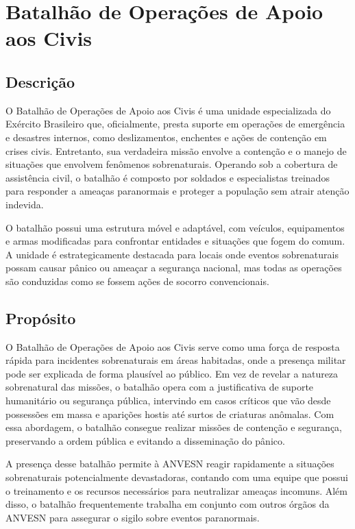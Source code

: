\documentclass{book}
\begin{document}
\chapter{Batalhão de Operações de Apoio aos Civis}
\section{Descrição}
O Batalhão de Operações de Apoio aos Civis é uma unidade especializada do Exército Brasileiro que, oficialmente, presta suporte em operações de emergência e desastres internos, como deslizamentos, enchentes e ações de contenção em crises civis. Entretanto, sua verdadeira missão envolve a contenção e o manejo de situações que envolvem fenômenos sobrenaturais. Operando sob a cobertura de assistência civil, o batalhão é composto por soldados e especialistas treinados para responder a ameaças paranormais e proteger a população sem atrair atenção indevida.

O batalhão possui uma estrutura móvel e adaptável, com veículos, equipamentos e armas modificadas para confrontar entidades e situações que fogem do comum. A unidade é estrategicamente destacada para locais onde eventos sobrenaturais possam causar pânico ou ameaçar a segurança nacional, mas todas as operações são conduzidas como se fossem ações de socorro convencionais.

\section{Propósito}
O Batalhão de Operações de Apoio aos Civis serve como uma força de resposta rápida para incidentes sobrenaturais em áreas habitadas, onde a presença militar pode ser explicada de forma plausível ao público. Em vez de revelar a natureza sobrenatural das missões, o batalhão opera com a justificativa de suporte humanitário ou segurança pública, intervindo em casos críticos que vão desde possessões em massa e aparições hostis até surtos de criaturas anômalas. Com essa abordagem, o batalhão consegue realizar missões de contenção e segurança, preservando a ordem pública e evitando a disseminação do pânico.

A presença desse batalhão permite à ANVESN reagir rapidamente a situações sobrenaturais potencialmente devastadoras, contando com uma equipe que possui o treinamento e os recursos necessários para neutralizar ameaças incomuns. Além disso, o batalhão frequentemente trabalha em conjunto com outros órgãos da ANVESN para assegurar o sigilo sobre eventos paranormais.
\end{document}
